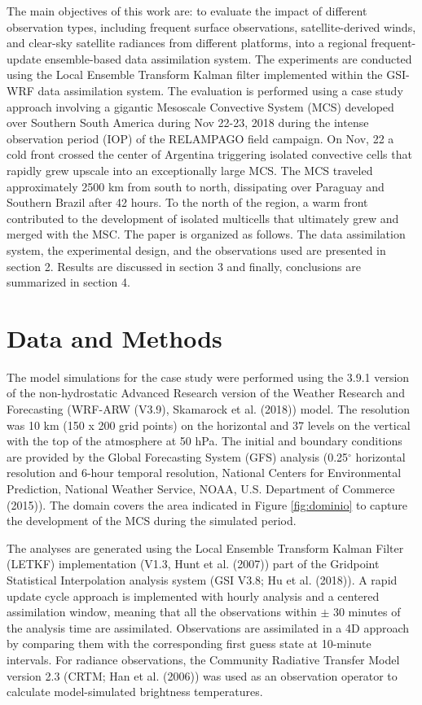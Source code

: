 \documentclass[final,5p,times,twocolumn,authoryear]{elsarticle} %
\begin{document}
The main objectives of this work are: to evaluate the impact of different observation types, including frequent surface observations, satellite-derived winds, and clear-sky satellite radiances from different platforms, into a regional frequent-update ensemble-based data assimilation system.
The experiments are conducted using the Local Ensemble Transform Kalman filter implemented within the GSI-WRF data assimilation system.
The evaluation is performed using a case study approach involving a gigantic Mesoscale Convective System (MCS) developed over Southern South America during Nov 22-23, 2018 during the intense observation period (IOP) of the RELAMPAGO field campaign.
On Nov, 22 a cold front crossed the center of Argentina triggering isolated convective cells that rapidly grew upscale into an exceptionally large MCS.
The MCS traveled approximately 2500 km from south to north, dissipating over Paraguay and Southern Brazil after 42 hours.
To the north of the region, a warm front contributed to the development of isolated multicells that ultimately grew and merged with the MSC.
The paper is organized as follows. The data assimilation system, the experimental design, and the observations used are presented in section 2. Results are discussed in section 3 and finally, conclusions are summarized in section 4.

\hypertarget{data-and-methods}{%
\section{Data and Methods}\label{data-and-methods}}

The model simulations for the case study were performed using the 3.9.1 version of the non-hydrostatic Advanced Research version of the Weather Research and Forecasting (WRF-ARW (V3.9), Skamarock et al. (2018)) model.
The resolution was 10 km (150 x 200 grid points) on the horizontal and 37 levels on the vertical with the top of the atmosphere at 50 hPa.
The initial and boundary conditions are provided by the Global Forecasting System (GFS) analysis (0.25\(^{\circ}\) horizontal resolution and 6-hour temporal resolution, National Centers for Environmental Prediction, National Weather Service, NOAA, U.S. Department of Commerce (2015)).
The domain covers the area indicated in Figure \ref{fig:dominio} to capture the development of the MCS during the simulated period.

The analyses are generated using the Local Ensemble Transform Kalman Filter (LETKF) implementation (V1.3, Hunt et al. (2007)) part of the Gridpoint Statistical Interpolation analysis system (GSI V3.8; Hu et al. (2018)).
A rapid update cycle approach is implemented with hourly analysis and a centered assimilation window, meaning that all the observations within \(\pm\) 30 minutes of the analysis time are assimilated.
Observations are assimilated in a 4D approach by comparing them with the corresponding first guess state at 10-minute intervals.
For radiance observations, the Community Radiative Transfer Model version 2.3 (CRTM; Han et al. (2006)) was used as an observation operator to calculate model-simulated brightness temperatures.
\end{document}
